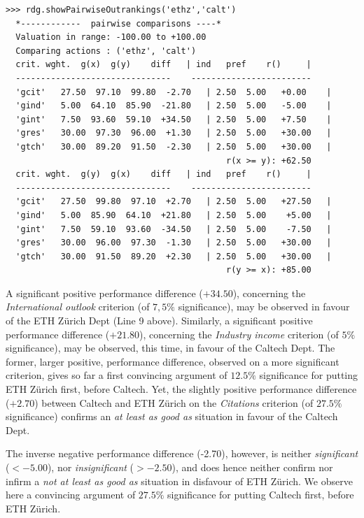 \begin{lstlisting}[caption={Comparing pairwise criteria performances},label=list:13.11]
>>> rdg.showPairwiseOutrankings('ethz','calt')
  *------------  pairwise comparisons ----*
  Valuation in range: -100.00 to +100.00
  Comparing actions : ('ethz', 'calt')
  crit. wght.  g(x)  g(y)    diff  	| ind   pref    r() 	| 
  -------------------------------  	 ------------------------
  'gcit'   27.50  97.10  99.80  -2.70 	| 2.50  5.00   +0.00 	| 
  'gind'   5.00  64.10  85.90  -21.80 	| 2.50  5.00   -5.00 	| 
  'gint'   7.50  93.60  59.10  +34.50 	| 2.50  5.00   +7.50 	| 
  'gres'   30.00  97.30  96.00  +1.30 	| 2.50  5.00   +30.00 	| 
  'gtch'   30.00  89.20  91.50  -2.30 	| 2.50  5.00   +30.00 	| 
                                            r(x >= y): +62.50
  crit. wght.  g(y)  g(x)    diff  	| ind   pref    r() 	|
  -------------------------------  	 ------------------------
  'gcit'   27.50  99.80  97.10  +2.70 	| 2.50  5.00   +27.50 	| 
  'gind'   5.00  85.90  64.10  +21.80 	| 2.50  5.00    +5.00 	| 
  'gint'   7.50  59.10  93.60  -34.50 	| 2.50  5.00    -7.50 	| 
  'gres'   30.00  96.00  97.30  -1.30 	| 2.50  5.00   +30.00 	| 
  'gtch'   30.00  91.50  89.20  +2.30 	| 2.50  5.00   +30.00 	| 
                                            r(y >= x): +85.00
\end{lstlisting}

A significant positive performance difference ($+34.50$), concerning the \emph{International outlook} criterion (of $7,5\%$ significance), may be observed in favour of the ETH Zürich Dept (Line 9 above). Similarly, a significant positive performance difference ($+21.80$), concerning the \emph{Industry income} criterion (of $5\%$ significance), may be observed, this time, in favour of the Caltech Dept. The former, larger positive, performance difference, observed on a more significant criterion, gives so far a first convincing argument of $12.5\%$ significance for putting ETH Zürich first, before Caltech. Yet, the slightly positive performance difference ($+2.70$) between Caltech and ETH Zürich on the \emph{Citations} criterion (of $27.5\%$ significance) confirms an \emph{at least as good as} situation in favour of the Caltech Dept.

The inverse negative performance difference (-2.70), however, is neither \emph{significant} ($< -5.00$), nor \emph{insignificant} ($> -2.50$), and does hence neither confirm nor infirm a \emph{not at least as good as} situation in disfavour of ETH Zürich. We observe here a convincing argument of $27.5\%$ significance for putting Caltech first, before ETH Zürich.

